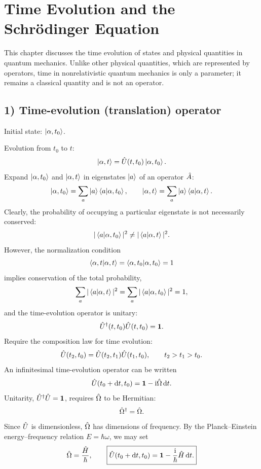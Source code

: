 \section{Time Evolution and the Schr\"odinger Equation}
This chapter discusses the time evolution of states and physical quantities in quantum mechanics. Unlike other physical quantities, which are represented by operators, time in nonrelativistic quantum mechanics is only a parameter; it remains a classical quantity and is not an operator.

\subsection*{1) Time-evolution (translation) operator}
Initial state: $\left|\alpha,t_0\right\rangle$.

Evolution from $t_0$ to $t$:
\begin{equation}
\left|\alpha,t\right\rangle=\hat{U}(t,t_0)\left|\alpha,t_0\right\rangle.
\end{equation}
Expand $\left|\alpha,t_0\right\rangle$ and $\left|\alpha,t\right\rangle$ in eigenstates $\left|a\right\rangle$ of an operator $\hat{A}$:
\begin{equation}
\left|\alpha,t_0\right\rangle=\sum_a\left|a\right\rangle\left\langle a\middle|\alpha,t_0\right\rangle,\qquad
\left|\alpha,t\right\rangle=\sum_a\left|a\right\rangle\left\langle a\middle|\alpha,t\right\rangle.
\end{equation}
Clearly, the probability of occupying a particular eigenstate is not necessarily conserved:
\begin{equation}
|\left\langle a\middle|\alpha,t_0\right\rangle|^2\ne|\left\langle a\middle|\alpha,t\right\rangle|^2.
\end{equation}
However, the normalization condition
\begin{equation}
\left\langle\alpha,t\middle|\alpha,t\right\rangle=\left\langle\alpha,t_0\middle|\alpha,t_0\right\rangle=1
\end{equation}
implies conservation of the total probability,
\begin{equation}
\sum_a|\left\langle a\middle|\alpha,t\right\rangle|^2=\sum_a|\left\langle a\middle|\alpha,t_0\right\rangle|^2=1,
\end{equation}
and the time-evolution operator is unitary:
\begin{equation}
\hat{U}^{\dagger}(t,t_0)\hat{U}(t,t_0)=\mathbf1.
\end{equation}
Require the composition law for time evolution:
\begin{equation}
\hat{U}(t_2,t_0)=\hat{U}(t_2,t_1)\hat{U}(t_1,t_0),\qquad t_2>t_1>t_0.
\end{equation}
An infinitesimal time-evolution operator can be written
\begin{equation}
\hat{U}(t_0+\mathrm{d} t,t_0)=\mathbf1-\mathrm{i}\hat{\Omega}\,\mathrm{d} t.
\end{equation}
Unitarity, $\hat{U}^{\dagger}\hat{U}=\mathbf1$, requires $\hat{\Omega}$ to be Hermitian:
\begin{equation}
\hat{\Omega}^{\dagger}=\hat{\Omega}.
\end{equation}
Since $\hat{U}$ is dimensionless, $\hat{\Omega}$ has dimensions of frequency. By the Planck--Einstein energy--frequency relation $E=\hbar\omega$, we may set
\begin{equation}
\hat{\Omega}=\frac{\hat{H}}{\hbar},\qquad
\boxed{\hat{U}(t_0+\mathrm{d} t,t_0)=\mathbf1-\frac{\mathrm{i}}{\hbar}\hat{H}\,\mathrm{d} t.}
\end{equation}

